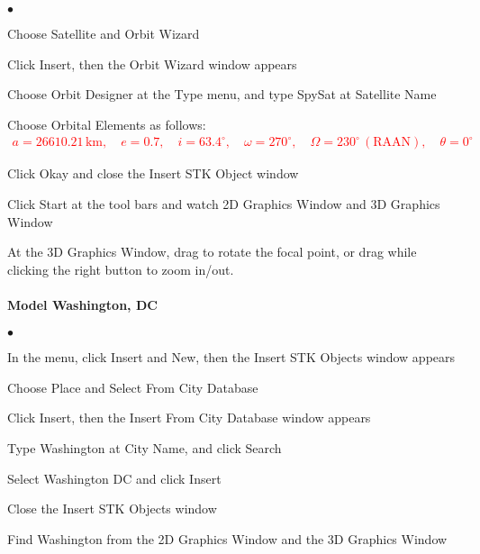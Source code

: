 \documentclass[10pt]{article}
\theoremstyle{plain}\theorembodyfont{\normalfont}
\renewcommand\emph[1]{\textsf{#1}}
\begin{document}
\begin{list}{$\bullet$}
{\setlength{\itemsep}{-3pt}\setlength{\leftmargin}{30pt}}
\item Choose \emph{Satellite} and \emph{Orbit Wizard}
\item Click \emph{Insert}, then the \emph{Orbit Wizard} window appears
\item Choose \emph{Orbit Designer} at the \emph{Type} menu, and type \emph{SpySat} at \emph{Satellite Name}
\item Choose \emph{Orbital Elements} as follows:
\textcolor{red}{
\begin{align*}
a=26610.21\,\mathrm{km},\quad e=0.7,\quad i=63.4^\circ,\quad 
\omega=270^\circ,\quad \Omega=230^\circ\,(\mbox{RAAN}),\quad \theta=0^\circ
\end{align*}}\vspace*{-0.5cm}
\item Click \emph{Okay} and close the \emph{Insert STK Object} window
\item Click \emph{Start} at the tool bars and watch \emph{2D Graphics Window} and \emph{3D Graphics Window}
\item At the \emph{3D Graphics Window,} drag to rotate the focal point, or drag while clicking the right button to zoom in/out.
\end{list}

\paragraph{Model Washington, DC}

\begin{list}{$\bullet$}
{\setlength{\itemsep}{-3pt}\setlength{\leftmargin}{30pt}}
\item In the menu, click \emph{Insert} and \emph{New}, then the \emph{Insert STK Objects} window appears
\item Choose \emph{Place} and \emph{Select From City Database}
\item Click \emph{Insert}, then the \emph{Insert From City Database} window appears
\item Type \emph{Washington} at City Name, and click \emph{Search}
\item Select Washington DC and click \emph{Insert}
\item Close the \emph{Insert STK Objects} window
\item Find Washington from the \emph{2D Graphics Window} and the \emph{3D Graphics Window}
\end{list}
\end{document}
